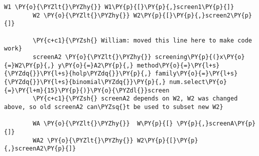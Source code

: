 \begin{Verbatim}[commandchars=\\\{\}]
        W1 \PY{o}{\PYZlt{}\PYZhy{}} W1\PY{p}{[}\PY{p}{,}screen1\PY{p}{]}
        W2 \PY{o}{\PYZlt{}\PYZhy{}} W2\PY{p}{[}\PY{p}{,}screen2\PY{p}{]}
        
        \PY{c+c1}{\PYZsh{} William: moved this line here to make code work}
        screenA2 \PY{o}{\PYZlt{}\PYZhy{}} screening\PY{p}{(}x\PY{o}{=}W2\PY{p}{,} y\PY{o}{=}A2\PY{p}{,} method\PY{o}{=}\PY{l+s}{\PYZdq{}}\PY{l+s}{holp\PYZdq{}}\PY{p}{,} family\PY{o}{=}\PY{l+s}{\PYZdq{}}\PY{l+s}{binomial\PYZdq{}}\PY{p}{,} num.select\PY{o}{=}\PY{l+m}{15}\PY{p}{)}\PY{o}{\PYZdl{}}screen 
        \PY{c+c1}{\PYZsh{} screenA2 depends on W2, W2 was changed above, so old screenA2 can\PYZsq{}t be used to subset new W2}
        
        WA \PY{o}{\PYZlt{}\PYZhy{}}  W\PY{p}{[} \PY{p}{,}screenA\PY{p}{]}
        WA2 \PY{o}{\PYZlt{}\PYZhy{}} W2\PY{p}{[}\PY{p}{,}screenA2\PY{p}{]}
\end{Verbatim}



